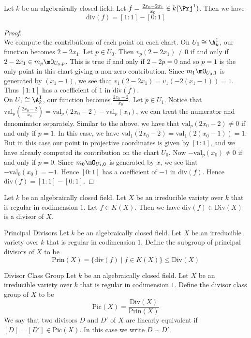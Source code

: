 \documentclass[a4paper]{article}
\begin{document}
\begin{eg}{}{}\\
Let $k$ be an algebraically closed field. Let $f=\frac{2x_0-2x_1}{x_0}\in k(\Prj^1)$. Then we have $$\text{div}(f)=[1:1]-[0:1]$$
\begin{proof}\\
We compute the contributions of each point on each chart. On $U_0\cong\A_k^1$, our function becomes $2-2x_1$. Let $p\in U_0$. Then $v_p(2-2x_1)\neq 0$ if and only if $2-2x_1\in m_p\mO_{U_0,p}$. This is true if and only if $2-2p=0$ and so $p=1$ is the only point in this chart giving a non-zero contribution. Since $m_1\mO_{U_0,1}$ is generated by $(x_1-1)$, we see that $v_1(2-2x_1)=v_1(-2(x_1-1))=1$. Thus $[1:1]$ has a coefficient of $1$ in $\text{div}(f)$. \\

On $U_1\cong\A_k^1$, our function becomes $\frac{2x_0-2}{x_0}$. Let $p\in U_1$. Notice that $\text{val}_p\left(\frac{2x_0-2}{x_0}\right)=\text{val}_p(2x_0-2)-\text{val}_p(x_0)$, we can treat the numerator and denominator separately. Similar to the above, we have that $\text{val}_p(2x_0-2)\neq 0$ if and only if $p=1$. In this case, we have $\text{val}_1(2x_0-2)=\text{val}_1(2(x_0-1))=1$. But in this case our point in projective coordinates is given by $[1:1]$, and we have already computed its contribution on the chart $U_0$. Now $-\text{val}_p(x_0)\neq 0$ if and only if $p=0$. Since $m_0\mO_{U_1,0}$ is generated by $x$, we see that $-\text{val}_0(x_0)=-1$. Hence $[0:1]$ has a coefficient of $-1$ in $\text{div}(f)$. Hence $\text{div}(f)=[1:1]-[0:1]$. 
\end{proof}
\end{eg}

\begin{lmm}{}{} Let $k$ be an algebraically closed field. Let $X$ be an irreducible variety over $k$ that is regular in codimension $1$. Let $f\in K(X)$. Then we have $\text{div}(f)\in\text{Div}(X)$ is a divisor of $X$. 
\end{lmm}

\begin{defn}{Principal Divisors}{} Let $k$ be an algebraically closed field. Let $X$ be an irreducible variety over $k$ that is regular in codimension $1$. Define the subgroup of principal divisors of $X$ to be $$\text{Prin}(X)=\{\text{div}(f)\;|\;f\in K(X)\}\leq\text{Div}(X)$$
\end{defn}

\begin{defn}{Divisor Class Group}{} Let $k$ be an algebraically closed field. Let $X$ be an irreducible variety over $k$ that is regular in codimension $1$. Define the divisor class group of $X$ to be $$\text{Pic}(X)=\frac{\text{Div}(X)}{\text{Prin}(X)}$$ We say that two divisors $D$ and $D'$ of $X$ are linearly equivalent if $[D]=[D']\in\text{Pic}(X)$. In this case we write $D\sim D'$. 
\end{defn}
\end{document}
